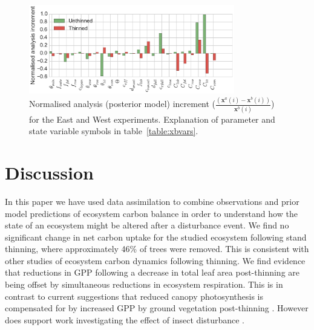 \documentclass[draft,linenumbers]{agujournal}
\begin{document}
\begin{figure}[ht]
    \centering
    \includegraphics[width=0.8\textwidth]{xa_incc.pdf}
    \caption{Normalised analysis (posterior model) increment \big($\frac{(\textbf{x}^a(i) - \textbf{x}^b(i))}{\textbf{x}^b(i)}$\big) for the East and West experiments. Explanation of parameter and state variable symbols in table~\ref{table:xbvars}.}
    \label{fig:xa_inc}
\end{figure}

\section{Discussion}
In this paper we have used data assimilation to combine observations and prior model predictions of ecosystem carbon balance in order to understand how the state of an ecosystem might be altered after a disturbance event. We find no significant change in net carbon uptake for the studied ecosystem following stand thinning, where approximately 46\% of trees were removed. This is consistent with other studies of ecosystem carbon dynamics following thinning. We find evidence that reductions in GPP following a decrease in total leaf area post-thinning are being offset by simultaneous reductions in ecosystem respiration. This is in contrast to current suggestions that reduced canopy photosynthesis is compensated for by increased GPP by ground vegetation post-thinning \citep{vesala2005effect, wilkinson2015effects, moreaux2011paired, dore2012recovery}. However does support work investigating the effect of insect disturbance \citep{ELE:ELE12097}.
\end{document}
